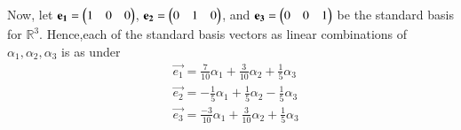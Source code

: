 Now, let $\mathbf{e_1} = \begin{pmatrix}1 & 0 & 0 \end{pmatrix}$, $\mathbf{e_2} = \begin{pmatrix}0 & 1 & 0 \end{pmatrix}$, and $\mathbf{e_3} = \begin{pmatrix}0 & 0 & 1 \end{pmatrix}$ be the standard basis for $\mathbb{R}^3$. Hence,each of the standard basis vectors as linear combinations of $\alpha_1, \alpha_2, \alpha_3$ is as under
\begin{align}
& \vec{e_1} = \frac{7}{10}\alpha_1 +\frac{3}{10} \alpha_2+\frac{1}{5}\alpha_3\\ 
& \vec{e_2} = -\frac{1}{5}\alpha_1 +\frac{1}{5} \alpha_2 -\frac{1}{5} \alpha_3 \\
& \vec{e_3} = \frac{-3}{10}\alpha_1 + \frac{3}{10} \alpha_2+\frac{1}{5}\alpha_3 
\end{align}


 
